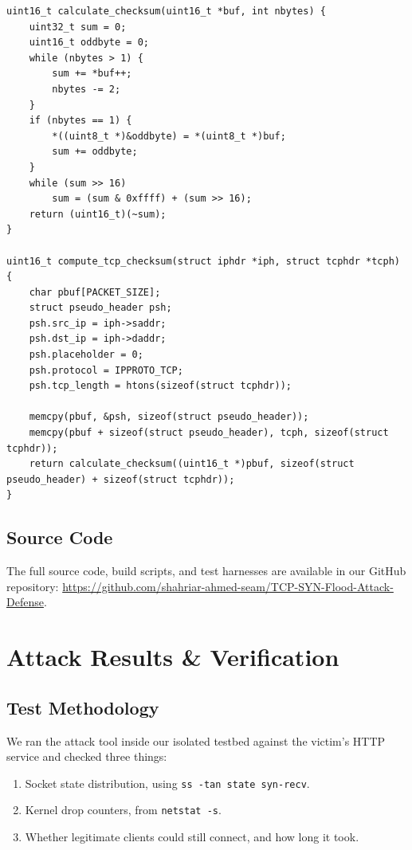 \documentclass[11pt,a4paper]{report}
\begin{document}
\begin{lstlisting}[style=customc, basicstyle=\ttfamily\scriptsize, caption={Our checksum routine (RFC 1071) with the TCP pseudo-header}]
uint16_t calculate_checksum(uint16_t *buf, int nbytes) {
    uint32_t sum = 0;
    uint16_t oddbyte = 0;
    while (nbytes > 1) {
        sum += *buf++;
        nbytes -= 2;
    }
    if (nbytes == 1) {
        *((uint8_t *)&oddbyte) = *(uint8_t *)buf;
        sum += oddbyte;
    }
    while (sum >> 16)
        sum = (sum & 0xffff) + (sum >> 16);
    return (uint16_t)(~sum);
}

uint16_t compute_tcp_checksum(struct iphdr *iph, struct tcphdr *tcph) {
    char pbuf[PACKET_SIZE];
    struct pseudo_header psh;
    psh.src_ip = iph->saddr;
    psh.dst_ip = iph->daddr;
    psh.placeholder = 0;
    psh.protocol = IPPROTO_TCP;
    psh.tcp_length = htons(sizeof(struct tcphdr));

    memcpy(pbuf, &psh, sizeof(struct pseudo_header));
    memcpy(pbuf + sizeof(struct pseudo_header), tcph, sizeof(struct tcphdr));
    return calculate_checksum((uint16_t *)pbuf, sizeof(struct pseudo_header) + sizeof(struct tcphdr));
}
\end{lstlisting}

\section{Source Code}
The full source code, build scripts, and test harnesses are available in our GitHub repository: \url{https://github.com/shahriar-ahmed-seam/TCP-SYN-Flood-Attack-Defense}.

\chapter{Attack Results \& Verification}

\section{Test Methodology}
We ran the attack tool inside our isolated testbed against the victim's HTTP service and checked three things:
\begin{enumerate}
    \item Socket state distribution, using \texttt{ss -tan state syn-recv}.
    \item Kernel drop counters, from \texttt{netstat -s}.
    \item Whether legitimate clients could still connect, and how long it took.
\end{enumerate}
\end{document}
